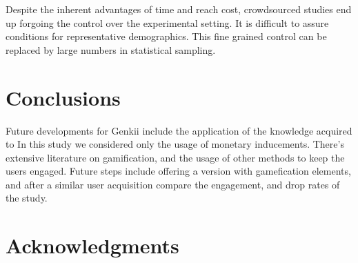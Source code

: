 \documentclass[letterpaper]{article}
\begin{document}
Despite the inherent advantages of time and reach cost, crowdsourced studies end up forgoing the control over the experimental setting. It is difficult to assure conditions for representative demographics. 
This fine grained control can be replaced by large numbers in statistical sampling. 
 


\section{Conclusions}

Future developments for Genkii include the application of the knowledge acquired to 
In this study we considered only the usage of monetary inducements. There's extensive literature on gamification, and the usage of other methods to keep the users engaged. Future steps include offering a version with gamefication elements, and after a similar user acquisition compare the engagement, and drop rates of the study.

\section{ Acknowledgments}
\end{document}
